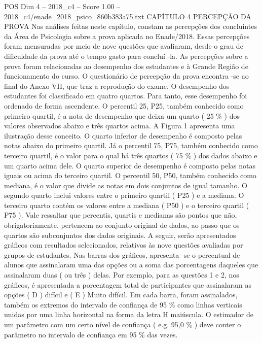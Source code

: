 \begin{textsample}{POS Dim 4 – 2018\_c4 – Score 1.00 – 2018\_c4/enade\_2018\_psico\_860b383a75.txt}  \label{ex:f4_pos_187}
CAPÍTULO 4 PERCEPÇÃO DA PROVA Nas análises feitas neste capítulo, constam as percepções dos concluintes da Área de Psicologia sobre a prova aplicada no Enade/2018.
Essas percepções foram mensuradas por meio de nove questões que avaliaram, desde o grau de dificuldade da prova até o tempo gasto para concluí -la.
As percepções sobre a prova foram relacionadas ao desempenho dos estudantes e à Grande Região de funcionamento do curso.
O questionário de percepção da prova encontra -se ao final do Anexo VII, que traz a reprodução do exame.
O desempenho dos estudantes foi classificado em quatro quartos.
Para tanto, esse desempenho foi ordenado de forma ascendente.
O percentil 25, P25, também conhecido como primeiro quartil, é a nota de desempenho que deixa um quarto ( 25 \% ) dos valores observados abaixo e três quartos acima.
A Figura 1 apresenta uma ilustração desse conceito.
O quarto inferior de desempenho é composto pelas notas abaixo do primeiro quartil.
Já o percentil 75, P75, também conhecido como terceiro quartil, é o valor para o qual há três quartos ( 75 \% ) dos dados abaixo e um quarto acima dele.
O quarto superior de desempenho é composto pelas notas iguais ou acima do terceiro quartil.
O percentil 50, P50, também conhecido como mediana, é o valor que divide as notas em dois conjuntos de igual tamanho.
O segundo quarto inclui valores entre o primeiro quartil ( P25 ) e a mediana.
O terceiro quarto contém os valores entre a mediana ( P50 ) e o terceiro quartil ( P75 ).
Vale ressaltar que percentis, quartis e medianas são pontos que não, obrigatoriamente, pertencem ao conjunto original de dados, ao passo que os quartos são subconjuntos dos dados originais.
A seguir, serão apresentados gráficos com resultados selecionados, relativos às nove questões avaliadas por grupos de estudantes.
Nas barras dos gráficos, apresenta -se o percentual de alunos que assinalaram uma das opções ou a soma das porcentagens daqueles que assinalaram duas ( ou três ) delas.
Por exemplo, para as questões 1 e 2, nos gráficos, é apresentada a porcentagem total de participantes que assinalaram as opções ( D ) difícil e ( E ) Muito difícil.
Em cada barra, foram assinalados, também os extremos do intervalo de confiança de 95 \% como linhas verticais unidas por uma linha horizontal na forma da letra H maiúscula.
O estimador de um parâmetro com um certo nível de confiança ( e.g. 95,0 \% ) deve conter o parâmetro no intervalo de confiança em 95 \% das vezes.

\end{textsample}

